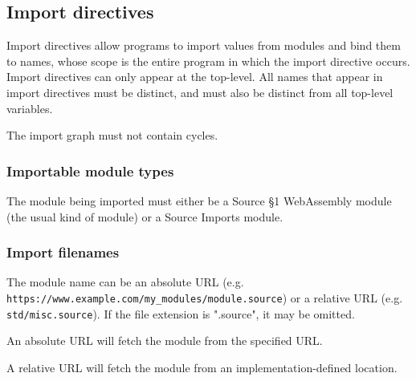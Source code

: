 \subsection*{Import directives}

Import directives allow programs to import values from modules and bind them to names, whose scope
is the entire program in which the import directive occurs.  Import directives can only appear at the top-level.  All names that appear in import directives
must be distinct, and must also be distinct from all top-level variables.

The import graph must not contain cycles.

\subsubsection*{Importable module types}

The module being imported must either be a Source \S 1 WebAssembly module (the usual kind of module) or a Source Imports module.

\subsubsection*{Import filenames}

The module name can be an absolute URL (e.g. \nolinkurl{https://www.example.com/my_modules/module.source}) or a relative URL (e.g. \nolinkurl{std/misc.source}).  If the file extension is ".source", it may be omitted.

An absolute URL will fetch the module from the specified URL.

A relative URL will fetch the module from an implementation-defined location.